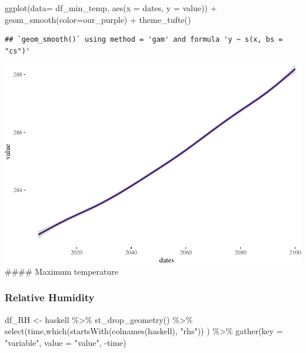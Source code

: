 \documentclass[
  paper=a4,
  ,captions=tableheading
]{scrartcl}
\newenvironment{Shaded}{\begin{snugshade}}{\end{snugshade}}
\newcommand{\AttributeTok}[1]{\textcolor[rgb]{0.77,0.63,0.00}{#1}}
\newcommand{\FunctionTok}[1]{\textcolor[rgb]{0.00,0.00,0.00}{#1}}
\newcommand{\NormalTok}[1]{#1}
\newcommand{\OtherTok}[1]{\textcolor[rgb]{0.56,0.35,0.01}{#1}}
\newcommand{\SpecialCharTok}[1]{\textcolor[rgb]{0.00,0.00,0.00}{#1}}
\newcommand{\StringTok}[1]{\textcolor[rgb]{0.31,0.60,0.02}{#1}}
\begin{document}
\begin{Shaded}
\begin{Highlighting}[]
\FunctionTok{ggplot}\NormalTok{(}\AttributeTok{data=}\NormalTok{ df\_min\_temp, }\FunctionTok{aes}\NormalTok{(}\AttributeTok{x =}\NormalTok{ dates, }\AttributeTok{y =}\NormalTok{ value)) }\SpecialCharTok{+} 
  \FunctionTok{geom\_smooth}\NormalTok{(}\AttributeTok{color=}\NormalTok{our\_purple) }\SpecialCharTok{+}
  \FunctionTok{theme\_tufte}\NormalTok{()}
\end{Highlighting}
\end{Shaded}

\begin{verbatim}
## `geom_smooth()` using method = 'gam' and formula 'y ~ s(x, bs = "cs")'
\end{verbatim}

\includegraphics{Haskell_files/figure-latex/unnamed-chunk-72-1.pdf}
\#\#\#\# Maximum temperature

\hypertarget{relative-humidity}{%
\subsubsection{Relative Humidity}\label{relative-humidity}}

\begin{Shaded}
\begin{Highlighting}[]
\NormalTok{df\_RH }\OtherTok{\textless{}{-}}\NormalTok{ haskell }\SpecialCharTok{\%\textgreater{}\%}
  \FunctionTok{st\_drop\_geometry}\NormalTok{() }\SpecialCharTok{\%\textgreater{}\%}
  \FunctionTok{select}\NormalTok{(time,}\FunctionTok{which}\NormalTok{(}\FunctionTok{startsWith}\NormalTok{(}\FunctionTok{colnames}\NormalTok{(haskell), }\StringTok{"rhs"}\NormalTok{)) ) }\SpecialCharTok{\%\textgreater{}\%}
  \FunctionTok{gather}\NormalTok{(}\AttributeTok{key =} \StringTok{"variable"}\NormalTok{, }\AttributeTok{value =} \StringTok{"value"}\NormalTok{, }\SpecialCharTok{{-}}\NormalTok{time)}
\end{Highlighting}
\end{Shaded}
\end{document}
